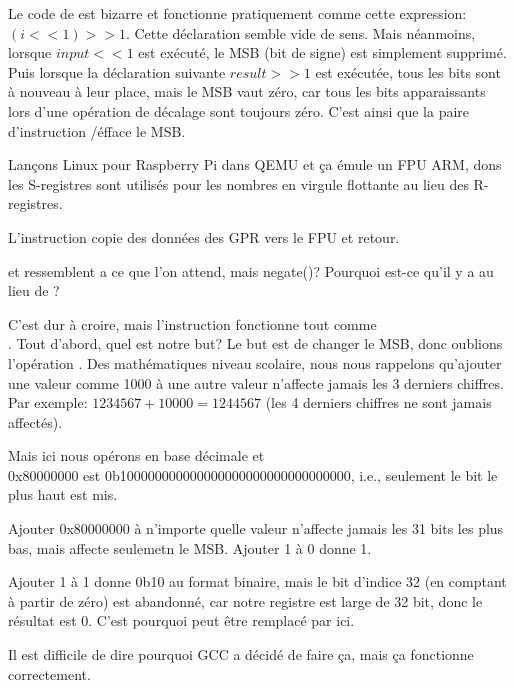 Le code de  est bizarre et fonctionne pratiquement comme cette expression:
$(i<<1)>>1$.
Cette déclaration semble vide de sens.
Mais néanmoins, lorsque $input<<1$ est exécuté, le \ac{MSB} (bit de signe) est simplement
supprimé.
Puis lorsque la déclaration suivante $result>>1$ est exécutée, tous les bits sont
à nouveau à leur place, mais le \ac{MSB} vaut zéro, car tous les  bits
apparaissants lors d'une opération de décalage sont toujours zéro.
C'est ainsi que la paire d'instruction \LSLS/\LSRS éfface le \ac{MSB}.




Lançons Linux pour Raspberry Pi dans QEMU et ça émule un FPU ARM, dons les S-registres
sont utilisés pour les nombres en virgule flottante au lieu des R-registres.


L'instruction \FMRS copie des données des \ac{GPR} vers le FPU et retour.

 et  ressemblent a ce que l'on attend, mais negate()?
Pourquoi est-ce qu'il y a \ADD au lieu de \XOR?

C'est dur à croire, mais l'instruction
 fonctionne tout comme \\
.
Tout d'abord, quel est notre but?
Le but est de changer le \ac{MSB}, donc oublions l'opération \XOR.
Des mathématiques niveau scolaire, nous nous rappelons qu'ajouter une valeur comme
1000 à une autre valeur n'affecte jamais les 3 derniers chiffres.
Par exemple: $1234567 + 10000 = 1244567$ (les 4 derniers chiffres ne sont jamais
affectés).

Mais ici nous opérons en base décimale et\\
0x80000000 est 0b100000000000000000000000000000000, i.e., seulement le bit le plus
haut est mis.

Ajouter 0x80000000 à n'importe quelle valeur n'affecte jamais les 31 bits les plus
bas, mais affecte seulemetn le \ac{MSB}.
Ajouter 1 à 0 donne 1.

Ajouter 1 à 1 donne 0b10 au format binaire, mais le bit d'indice 32 (en comptant
à partir de zéro) est abandonné, car notre registre est large de 32 bit, donc le
résultat est 0.
C'est pourquoi \XOR peut être remplacé par \ADD ici.

Il est difficile de dire pourquoi GCC a décidé de faire ça, mais ça fonctionne correctement.
